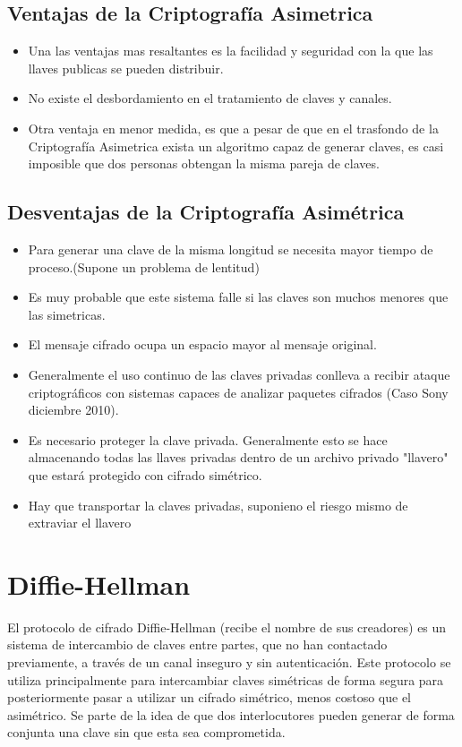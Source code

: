 \documentclass[10pt, conference]{IEEEtran}
\begin{document}
\subsection{Ventajas de la Criptografía Asimetrica}
\begin{itemize}
\item Una las ventajas mas resaltantes es  la facilidad y seguridad con la que las llaves publicas se pueden distribuir.
\item No existe el desbordamiento en el tratamiento de claves y canales.
\item Otra ventaja en menor medida, es que a pesar de que en el trasfondo de la Criptografía Asimetrica exista un algoritmo capaz de generar claves, es casi imposible que dos personas obtengan la misma pareja de claves.
\end{itemize}

\subsection{Desventajas de la Criptografía Asimétrica}
\begin{itemize}
\item Para generar una clave de la misma longitud se necesita mayor tiempo de proceso.(Supone un problema de lentitud)
\item Es muy probable que este sistema falle si las claves son muchos menores que las simetricas.
\item El mensaje cifrado ocupa un espacio mayor al mensaje original.
\item Generalmente el uso continuo de las claves privadas conlleva a recibir ataque criptográficos con sistemas capaces de analizar paquetes cifrados (Caso Sony diciembre 2010).
\item Es necesario proteger la clave privada. Generalmente esto se hace almacenando todas las llaves privadas dentro de un archivo privado "llavero" que estará protegido con cifrado simétrico.
\item Hay que transportar la claves privadas, suponieno el riesgo mismo de extraviar el llavero 
\end{itemize}

\section{Diffie-Hellman}
El protocolo de cifrado Diffie-Hellman (recibe el nombre de sus creadores) es un sistema de intercambio de claves entre partes, que no han contactado previamente, a través de un canal inseguro y sin autenticación.
Este protocolo se utiliza principalmente para intercambiar claves simétricas de forma segura para posteriormente pasar a utilizar un cifrado simétrico, menos costoso que el asimétrico.
Se parte de la idea de que dos interlocutores pueden generar de forma conjunta una clave sin que esta sea comprometida.
\end{document}
